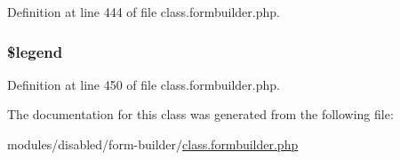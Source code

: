 Definition at line 444 of file class.\-formbuilder.\-php.

\hypertarget{class_form_builder_fieldset_aa5122ec2579420d7ced620e94b516998}{
\subsubsection[{\$legend}]{\setlength{\rightskip}{0pt plus 5cm}\$legend}}\label{class_form_builder_fieldset_aa5122ec2579420d7ced620e94b516998}


Definition at line 450 of file class.\-formbuilder.\-php.



The documentation for this class was generated from the following file\-:\begin{DoxyCompactItemize}
\item 
modules/disabled/form-\/builder/\hyperlink{class_8formbuilder_8php}{class.\-formbuilder.\-php}\end{DoxyCompactItemize}
